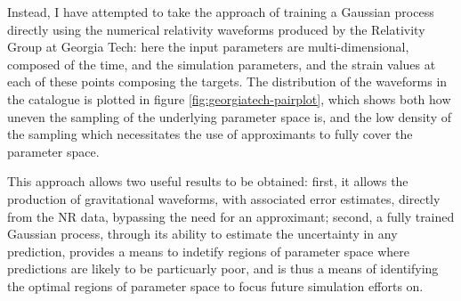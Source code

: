 \documentclass[openleft]{kentigern}
\theoremstyle{definition}
\begin{document}
Instead, I have attempted to take the approach of training a Gaussian
process directly using the numerical relativity waveforms produced by
the Relativity Group at Georgia Tech\cite{gatechcat}: here the input
parameters are multi-dimensional, composed of the time, and the
simulation parameters, and the strain values at each of these points
composing the targets. The distribution of the waveforms in the
catalogue is plotted in figure \ref{fig:georgiatech-pairplot}, which
shows both how uneven the sampling of the underlying parameter space
is, and the low density of the sampling which necessitates the use of
approximants to fully cover the parameter space.

This approach allows two useful results to be obtained: first, it
allows the production of gravitational waveforms, with associated
error estimates, directly from the NR data, bypassing the need for an
approximant; second, a fully trained Gaussian process, through its
ability to estimate the uncertainty in any prediction, provides a
means to indetify regions of parameter space where predictions are
likely to be particuarly poor, and is thus a means of identifying the
optimal regions of parameter space to focus future simulation efforts
on.
\end{document}
